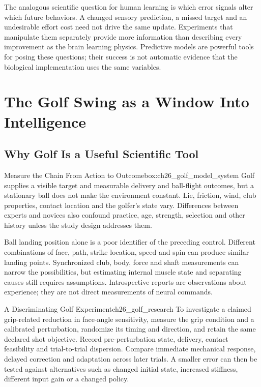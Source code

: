 The analogous scientific question for human learning is which error signals alter which future behaviors. A changed sensory prediction, a missed target and an undesirable effort cost need not drive the same update. Experiments that manipulate them separately provide more information than describing every improvement as the brain learning physics. Predictive models are powerful tools for posing these questions; their success is not automatic evidence that the biological implementation uses the same variables.

\section{The Golf Swing as a Window Into Intelligence}
\label{sec:ch26_window_into_intelligence}

\subsection{Why Golf Is a Useful Scientific Tool}
\label{subsec:ch26_golf_science}

\begin{principle}{Measure the Chain From Action to Outcome}{box:ch26_golf_model_system}
Golf supplies a visible target and measurable delivery and ball-flight outcomes, but a stationary ball does not make the environment constant. Lie, friction, wind, club properties, contact location and the golfer's state vary. Differences between experts and novices also confound practice, age, strength, selection and other history unless the study design addresses them.
\end{principle}

Ball landing position alone is a poor identifier of the preceding control. Different combinations of face, path, strike location, speed and spin can produce similar landing points. Synchronized club, body, force and shaft measurements can narrow the possibilities, but estimating internal muscle state and separating causes still requires assumptions. Introspective reports are observations about experience; they are not direct measurements of neural commands.

\begin{example}{A Discriminating Golf Experiment}{ch26_golf_research}
To investigate a claimed grip-related reduction in face-angle sensitivity, measure the grip condition and a calibrated perturbation, randomize its timing and direction, and retain the same declared shot objective. Record pre-perturbation state, delivery, contact feasibility and trial-to-trial dispersion. Compare immediate mechanical response, delayed correction and adaptation across later trials. A smaller error can then be tested against alternatives such as changed initial state, increased stiffness, different input gain or a changed policy.
\end{example}

